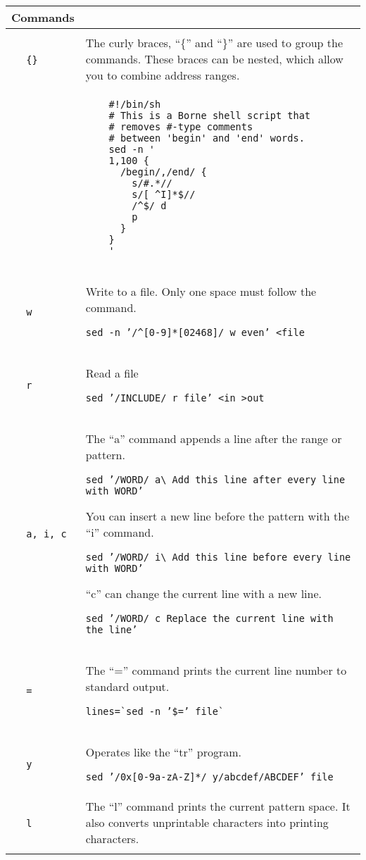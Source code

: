 \documentclass[a4paper,10pt,landscape,twocolumn]{article}
\newcommand{\commanddescr}[2]{\small ~~ \texttt{#1} & \small #2 \smallskip \\ }
\newenvironment{mycommands}[1]
               { \begin{tabular}{lp{9cm}} \\
                   \large{\textbf{#1}} \medskip \\ \hline \\}
               { \\ \hline \end{tabular} \medskip }
\newcommand{\sedex}[1]{\textcolor[gray]{0.40}{\texttt{#1}}}
\begin{document}
 \pagebreak

\begin{mycommands}{Commands}
  \commanddescr{\{{}\}{}}{
    The curly braces, ``\{{}'' and ``\}{}'' are used to group the commands. 
    These braces can be nested, which allow you to combine address ranges.
  }
  &
  \begin{lstlisting}
    #!/bin/sh
    # This is a Borne shell script that 
    # removes #-type comments
    # between 'begin' and 'end' words.
    sed -n '
    1,100 {
      /begin/,/end/ {
        s/#.*//
        s/[ ^I]*$//
        /^$/ d
        p
      }
    }
    '
  \end{lstlisting}
  \\
  \commanddescr{w}{
    Write to a file. Only one space must follow the command.

    \sedex{sed -n '/\^{}[0-9]*[02468]/ w even' <file}
  }

  \commanddescr{r}{
    Read a file

    \sedex{sed '/INCLUDE/ r file' <in >out}

  }

  \commanddescr{a, i, c}{
    The ``a'' command appends a line after the range or pattern.

    \sedex{sed '/WORD/ a\textbackslash{} \newline 
      Add this line after every line with WORD'}

    You can insert a new line before the pattern with the ``i'' command.

    \sedex{sed '/WORD/ i\textbackslash{} \newline
      Add this line before every line with WORD'}

    ``c'' can change the current line with a new line.

    \sedex{sed '/WORD/ c\
      Replace the current line with the line'}
    }

  \commanddescr{=}{
    The ``='' command prints the current line number to standard output.

    \sedex{lines=\`{}sed -n '\${}=' file\`{}}
  }

  \commanddescr{y}{
    Operates like the ``tr'' program.

    \sedex{sed '/0x[0-9a-zA-Z]*/ y/abcdef/ABCDEF' file}
  }
  
  \commanddescr{l}{
    The ``l'' command prints the current pattern space. 
    It also converts unprintable characters into printing characters.
  }
  
\end{mycommands}
  
\end{document}
